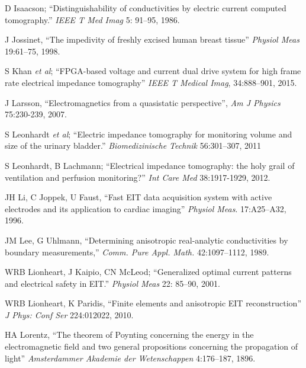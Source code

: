 \documentclass[10pt,journal]{IEEEtran}\def\TBLWIDA{15mm}\def\TBLWIDB{60mm}
\newcommand{\ifmaxthree}[2]{#2 {\em et al}; }
\begin{document}
\begin{thebibliography}{00}
D Isaacson;
``Distinguishability of conductivities by electric current computed tomography.''
{\em IEEE T Med Imag} 5: 91--95, 1986.

J Jossinet,
``The impedivity of freshly excised human breast tissue''
{\em Physiol Meas} 19:61--75, 1998.


\ifmaxthree{
S Khan, P Manwaring, A Borsic, R Halter, 
}{
S Khan
}
``FPGA-based voltage and current dual drive system for high frame rate electrical impedance tomography''
{\em IEEE T Medical Imag}, 34:888--901, 2015.

J Larsson,
``Electromagnetics from a quasistatic perspective'',
{\em Am J Physics} 75:230-239, 2007.

\ifmaxthree{
S Leonhardt, A Cordes, H Plewa, R Pikkemaat, I Soljanik, K Moehring, HJ Gerner, R Rupp,
}{
S Leonhardt
}
``Electric impedance tomography for monitoring volume and size of the urinary bladder.''
{\em Biomedizinische Technik} 56:301--307, 2011

S Leonhardt, B Lachmann;
``Electrical impedance tomography: the holy grail of
ventilation and perfusion monitoring?''
{\em Int Care Med} 38:1917-1929, 2012.

JH Li, C Joppek, U Faust,
``Fast EIT data acquisition system with active electrodes and its application to cardiac imaging''
{\em  Physiol Meas}. 17:A25--A32, 1996.

JM Lee, G Uhlmann, ``Determining anisotropic real-analytic
 conductivities by boundary measurements,''
{\em Comm. Pure Appl. Math.} 42:1097--1112, 1989.

WRB Lionheart, J Kaipio, CN McLeod;
``Generalized optimal current patterns and electrical safety in EIT.'' 
{\em Physiol Meas} 22: 85--90, 2001.

WRB Lionheart, K Paridis,
``Finite elements and anisotropic EIT reconstruction''
{\em  J Phys: Conf Ser} 224:012022, 2010.

HA Lorentz,
``The theorem of Poynting concerning the energy in the electromagnetic
field and two general propositions concerning the propagation of light''
{\em  Amsterdammer Akademie der Wetenschappen} 4:176--187, 1896.



\end{thebibliography}
\end{document}
